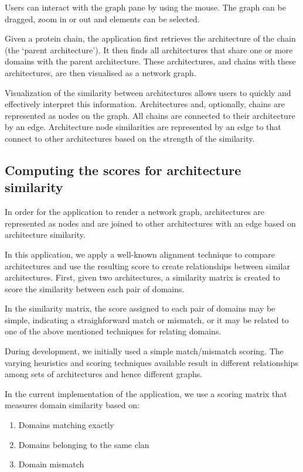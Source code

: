 Users can interact with the graph pane by using the mouse. The graph can be dragged, zoom in or out and elements can be selected.

Given a protein chain, the application first retrieves the architecture of the chain (the `parent architecture'). It then finds all architectures that share one or more domains with the parent architecture.  These architectures, and chains with these architectures, are then visualised as a network graph.

Visualization of the similarity between architectures allows users to quickly and effectively interpret this information. Architectures and, optionally, chains are represented as nodes on the graph. All chains are connected to their architecture by an edge. Architecture node similarities are represented by an edge to that connect to other architectures based on the strength of the similarity. 


\subsection{Computing the scores for architecture similarity}

In order for the application to render a network graph, architectures are represented as nodes and are joined to other architectures with an edge based on architecture similarity.

In this application, we apply a well-known alignment technique to compare architectures and use the resulting score to create relationships between similar architectures. First, given two architectures, a similarity matrix is created to score the similarity between each pair of domains. 

In the similarity matrix, the score assigned to each pair of domains may be simple, indicating a straighforward match or mismatch, or it may be related to one of the above mentioned techniques for relating domains.

During development, we initially used a simple match/mismatch scoring. The varying heuristics and scoring techniques available result in different relationships among sets of architectures and hence different graphs.

In the current implementation of the application, we use a scoring matrix that measures domain similarity based on:
\begin{enumerate}
	\item Domains matching exactly
	\item Domains belonging to the same clan
	\item Domain mismatch
\end{enumerate}

